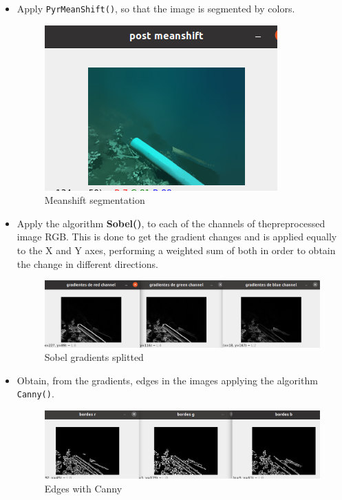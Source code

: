 \documentclass[12pt, a4paper]{article}
\begin{document}
\begin{itemize}
    \item Apply \verb|PyrMeanShift()|, so that the image is segmented by colors.
    
    \begin{figure}[H]
        \centering
        \includegraphics[scale=0.3]{images_doc/meanshift.png}
        \caption{Meanshift segmentation}
        \label{fig:menas}
    \end{figure}

    \item Apply the algorithm \textbf{Sobel()}, to each of the channels of thepreprocessed  image
    RGB. This is done to get the gradient changes and is applied equally
    to the X and Y axes, performing a weighted sum of both in order to obtain the
    change in different directions.

    \begin{figure}[H]
        \centering
        \includegraphics[scale=0.3]{images_doc/gradientes.png}
        \caption{Sobel gradients splitted}
        \label{fig:Sobel}
    \end{figure}

    \item Obtain, from the gradients, edges in the images applying the
    algorithm \verb|Canny()|.

    \begin{figure}[H]
        \centering
        \includegraphics[scale=0.3]{images_doc/bordes.png}
        \caption{Edges with Canny}
        \label{fig:Canny}
    \end{figure}



\end{itemize}
\end{document}

